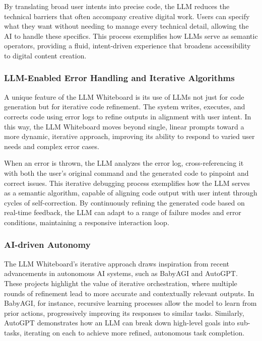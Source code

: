 By translating broad user intents into precise code, the LLM reduces the technical barriers that often accompany creative digital work.
Users can specify what they want without needing to manage every technical detail, allowing the AI to handle these specifics.
This process exemplifies how LLMs serve as semantic operators, providing a fluid, intent-driven experience that broadens accessibility to digital content creation.

\subsubsection{LLM-Enabled Error Handling and Iterative Algorithms}

A unique feature of the LLM Whiteboard is its use of LLMs not just for code generation but for iterative code refinement.
The system writes, executes, and corrects code using error logs to refine outputs in alignment with user intent.
In this way, the LLM Whiteboard moves beyond single, linear prompts toward a more dynamic, iterative approach, improving its ability to respond to varied user needs and complex error cases.

When an error is thrown, the LLM analyzes the error log, cross-referencing it with both the user’s original command and the generated code to pinpoint and correct issues.
This iterative debugging process exemplifies how the LLM serves as a semantic algorithm, capable of aligning code output with user intent through cycles of self-correction.
By continuously refining the generated code based on real-time feedback, the LLM can adapt to a range of failure modes and error conditions, maintaining a responsive interaction loop.

\subsubsection{AI-driven Autonomy}
The LLM Whiteboard’s iterative approach draws inspiration from recent advancements in autonomous AI systems, such as BabyAGI\cite{nakajima2024} and AutoGPT\cite{autogpt2024}.
These projects highlight the value of iterative orchestration, where multiple rounds of refinement lead to more accurate and contextually relevant outputs.
In BabyAGI, for instance, recursive learning processes allow the model to learn from prior actions, progressively improving its responses to similar tasks.
Similarly, AutoGPT demonstrates how an LLM can break down high-level goals into sub-tasks, iterating on each to achieve more refined, autonomous task completion.

